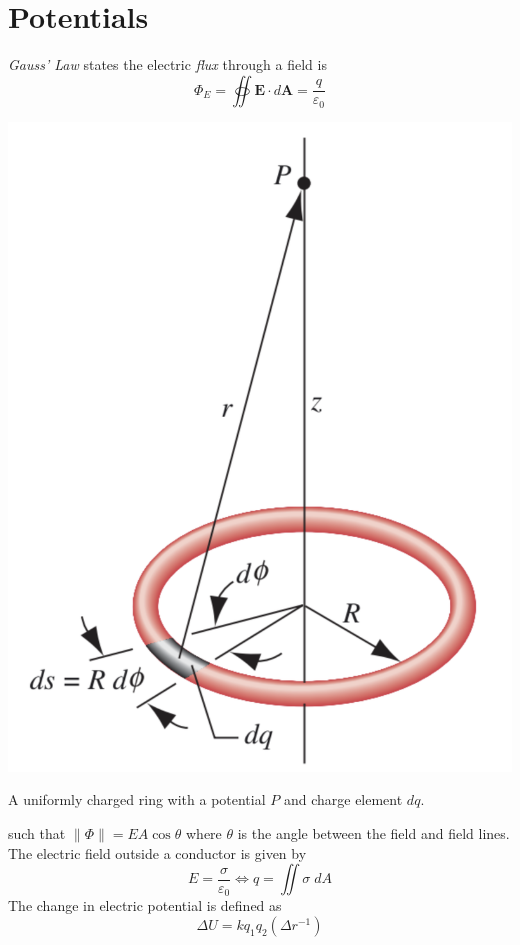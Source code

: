 \documentclass{tufte-book}
\renewcommand{\b}{\mathbf}
\begin{document}
\section{Potentials}
\emph{Gauss' Law} states the electric \emph{flux} through a field is
\begin{equation}
  \Phi_E = \oiint \b E \cdot d \b A = \frac{q}{\varepsilon_0}
\end{equation}
%
\begin{marginfigure}
  \includegraphics[scale=0.15]{potential}
  \caption{A uniformly charged ring with a potential $P$ and charge element $dq$.}
\end{marginfigure}
%
such that $\| \Phi \| = EA \cos \theta$ where $\theta$ is the angle between the field and field lines. The electric field outside a conductor is given by  \begin{equation}
  E = \frac{\sigma}{\varepsilon_0} \iff q = \iint \sigma \; dA
\end{equation}
The change in electric potential is defined as
\begin{equation}
  \Delta U = kq_1q_2 (\Delta r^{-1})
\end{equation}
\end{document}

